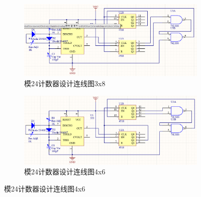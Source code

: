 \documentclass{ctexrep}
\begin{document}
\begin{figure}[htpb]
	\centering
	\begin{subfigure}[htpb]{.45\linewidth}
		\centering
		\includegraphics[width=\linewidth]{3x8.png}
		\caption{模24计数器设计连线图3x8}
		\label{fig:模24计数器设计连线图3x8}
	\end{subfigure}
	\quad
	\begin{subfigure}[htpb]{.45\linewidth}
		\centering
		\includegraphics[width=\linewidth]{4x6.png}
		\caption{模24计数器设计连线图4x6}
		\label{fig:模24计数器设计连线图4x6}
	\end{subfigure}


\end{figure}
\end{document}
